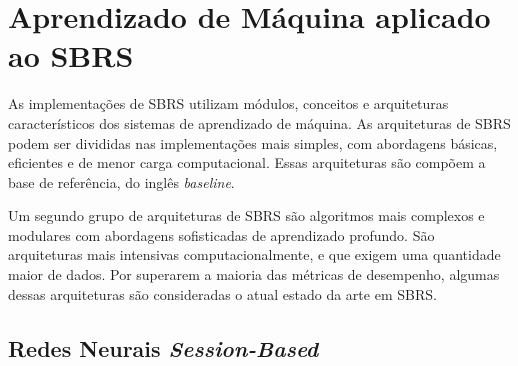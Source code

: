 





\section{Aprendizado de Máquina aplicado ao SBRS}

As implementações de SBRS utilizam módulos, conceitos e arquiteturas
característicos dos sistemas de aprendizado de máquina. As arquiteturas de SBRS
podem ser divididas nas implementações mais simples, com abordagens básicas,
eficientes e de menor carga computacional. Essas arquiteturas são compõem a base de referência, do inglês
\textit{baseline}.

Um segundo grupo de arquiteturas de SBRS são algoritmos mais complexos e
modulares com abordagens sofisticadas de aprendizado profundo. São arquiteturas
mais intensivas computacionalmente, e que exigem uma quantidade maior de dados.
Por superarem a maioria das métricas de desempenho, algumas dessas arquiteturas
são consideradas o atual estado da arte em SBRS.

\subsection{Redes Neurais \textit{Session-Based}}
